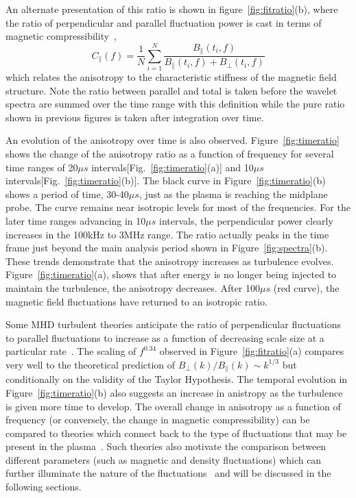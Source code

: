 \documentclass[manuscript]{aastex}
\begin{document}
An alternate presentation of this ratio is shown in figure~\ref{fig:fitratio}(b), where the ratio of perpendicular and parallel fluctuation power is cast in terms of magnetic compressibility~\citep{kiy13},
\begin{equation}
C_{\parallel}(f) = \frac{1}{N}\sum^{N}_{i=1}\frac{B_{\parallel}(t_{i},f)}{B_{\parallel}(t_{i},f)+B_{\perp}(t_{i},f)}
\label{eq:magcompress}
\end{equation}
which relates the anisotropy to the characteristic stiffness of the magnetic field structure. Note the ratio between parallel and total is taken before the wavelet spectra are summed over the time range with this definition while the pure ratio shown in previous figures is taken after integration over time.

An evolution of the anisotropy over time is also observed. Figure~\ref{fig:timeratio} shows the change of the anisotropy ratio as a function of frequency for several time ranges of 20$\mu s$ intervals[Fig.~\ref{fig:timeratio}(a)] and 10$\mu s$ intervals[Fig.~\ref{fig:timeratio}(b)]. The black curve in Figure~\ref{fig:timeratio}(b) shows a period of time, 30-40$\mu s$, just as the plasma is reaching the midplane probe. The curve remains near isotropic levels for most of the frequencies. For the later time ranges advancing in 10$\mu s$ intervals, the perpendicular power clearly increases in the 100kHz to 3MHz range. The ratio actually peaks in the time frame just beyond the main analysis period shown in Figure~\ref{fig:spectra}(b). These trends demonstrate that the anisotropy increases as turbulence evolves. Figure~\ref{fig:timeratio}(a), shows that after energy is no longer being injected to maintain the turbulence, the anisotropy decreases. After 100$\mu s$ (red curve), the magnetic field fluctuations have returned to an isotropic ratio.

Some MHD turbulent theories anticipate the ratio of perpendicular fluctuations to parallel fluctuations to increase as a function of decreasing scale size at a particular rate~\citep{sri95,bol06}. The scaling of $f^{0.34}$ observed in Figure~\ref{fig:fitratio}(a) compares very well to the theoretical prediction of $B_{\perp}(k)/B_{\parallel}(k) \sim k^{1/3}$ but conditionally on the validity of the Taylor Hypothesis. The temporal evolution in Figure~\ref{fig:timeratio}(b) also suggests an increase in anistropy as the turbulence is given more time to develop. The overall change in anisotropy as a function of frequency (or conversely, the change in magnetic compressibility) can be compared to theories which connect back to the type of fluctuations that may be present in the plasma~\citep{ten12,kiy13}. Such theories also motivate the comparison between different parameters (such as magnetic and density fluctuations) which can further illuminate the nature of the fluctuations~\citep{kle12} and will be discussed in the following sections.
\end{document}
